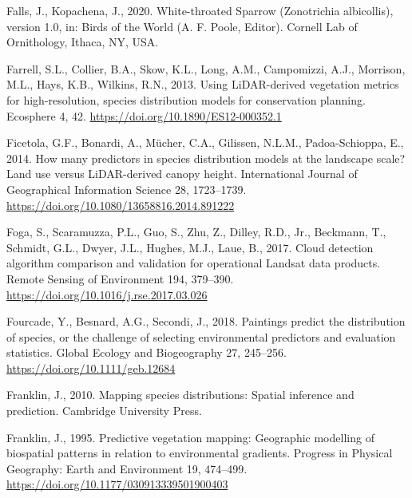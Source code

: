 \documentclass[
]{article}
\newlength{\cslhangindent}
\newlength{\cslentryspacingunit} %
\newenvironment{CSLReferences}[2] %
 {%
  \setlength{\parindent}{0pt}
  \ifodd #1
  \let\oldpar\par
  \def\par{\hangindent=\cslhangindent\oldpar}
  \fi
  \setlength{\parskip}{#2\cslentryspacingunit}
 }%
 {}
\begin{document}
\begin{CSLReferences}{1}{0}
\leavevmode{}%
Falls, J., Kopachena, J., 2020. White-throated {Sparrow} ({Zonotrichia} albicollis), version 1.0, in: Birds of the {World} ({A}. {F}. {Poole}, {Editor}). Cornell Lab of Ornithology, Ithaca, NY, USA.

\leavevmode{}%
Farrell, S.L., Collier, B.A., Skow, K.L., Long, A.M., Campomizzi, A.J., Morrison, M.L., Hays, K.B., Wilkins, R.N., 2013. Using {LiDAR}-derived vegetation metrics for high-resolution, species distribution models for conservation planning. Ecosphere 4, 42. \url{https://doi.org/10.1890/ES12-000352.1}

\leavevmode{}%
Ficetola, G.F., Bonardi, A., Mücher, C.A., Gilissen, N.L.M., Padoa-Schioppa, E., 2014. How many predictors in species distribution models at the landscape scale? {Land} use versus {LiDAR}-derived canopy height. International Journal of Geographical Information Science 28, 1723--1739. \url{https://doi.org/10.1080/13658816.2014.891222}

\leavevmode{}%
Foga, S., Scaramuzza, P.L., Guo, S., Zhu, Z., Dilley, R.D., Jr., Beckmann, T., Schmidt, G.L., Dwyer, J.L., Hughes, M.J., Laue, B., 2017. Cloud detection algorithm comparison and validation for operational {Landsat} data products. Remote Sensing of Environment 194, 379--390. \url{https://doi.org/10.1016/j.rse.2017.03.026}

\leavevmode{}%
Fourcade, Y., Besnard, A.G., Secondi, J., 2018. Paintings predict the distribution of species, or the challenge of selecting environmental predictors and evaluation statistics. Global Ecology and Biogeography 27, 245--256. \url{https://doi.org/10.1111/geb.12684}

\leavevmode{}%
Franklin, J., 2010. Mapping species distributions: Spatial inference and prediction. Cambridge University Press.

\leavevmode{}%
Franklin, J., 1995. Predictive vegetation mapping: Geographic modelling of biospatial patterns in relation to environmental gradients. Progress in Physical Geography: Earth and Environment 19, 474--499. \url{https://doi.org/10.1177/030913339501900403}


\end{CSLReferences}
\end{document}
